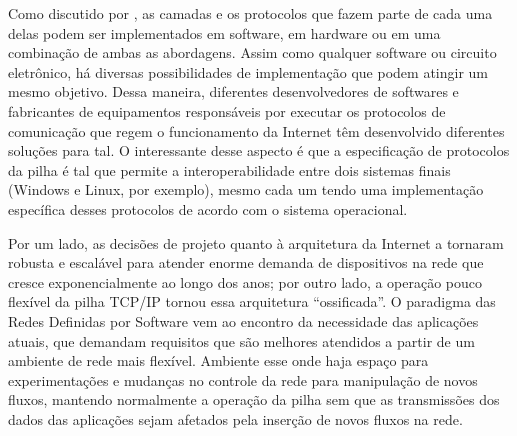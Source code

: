 \documentclass[	12pt, Times, openright, twoside, a4paper, english, brazil]{abntex2}
\newcommand{\bkc}[1]{{\color{blue}{#1}}} %
\begin{document}
Como discutido por , as camadas e os protocolos que fazem parte de cada uma delas podem ser implementados em software, em hardware ou em uma combinação de ambas as abordagens. Assim como qualquer software ou circuito eletrônico, há diversas possibilidades de implementação que podem atingir um mesmo objetivo. Dessa maneira, diferentes desenvolvedores de softwares e fabricantes de equipamentos responsáveis por executar os protocolos de comunicação que regem o funcionamento da Internet têm desenvolvido diferentes soluções para tal. O interessante desse aspecto é que a especificação de protocolos da pilha é tal que permite a interoperabilidade entre dois sistemas finais (Windows e Linux, por exemplo), mesmo cada um tendo uma implementação específica desses protocolos de acordo com o sistema operacional.

Por um lado, as decisões de projeto quanto à arquitetura da Internet a tornaram robusta e escalável para atender enorme demanda de dispositivos na rede que cresce exponencialmente ao longo dos anos; por outro lado, a operação pouco flexível da pilha TCP/IP tornou essa arquitetura ``ossificada''. O paradigma das Redes Definidas por Software vem ao encontro da necessidade das aplicações atuais, que demandam requisitos que são melhores atendidos a partir de um ambiente de rede mais flexível. Ambiente esse onde haja espaço para experimentações e mudanças no controle da rede para manipulação de novos fluxos, mantendo normalmente a operação da pilha sem que as transmissões dos dados das aplicações sejam afetados pela inserção de novos fluxos na rede.


\end{document}
